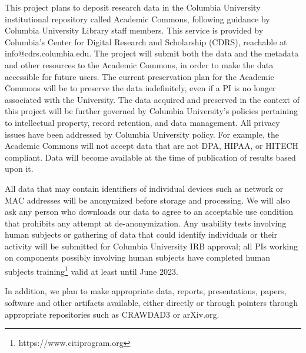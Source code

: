 \documentclass[11pt]{article}
\begin{document}
This project plans to deposit research data in the Columbia University institutional repository called Academic Commons, following guidance by Columbia University Library staff members. This service is provided by Columbia's Center for Digital Research and Scholarship (CDRS), reachable at info@cdrs.columbia.edu. The project will submit both the data and the metadata and other resources to the Academic Commons, in order to make the data accessible for future users.  The current preservation plan for the Academic Commons will be to preserve the data indefinitely, even if a PI is no longer associated with the University. The data acquired and preserved in the context of this project will be further governed by Columbia University's policies pertaining to intellectual property, record retention, and data management. All privacy issues have been addressed by Columbia University policy. For example, the Academic Commons will not accept data that are not DPA, HIPAA, or HITECH compliant. Data will become available at the time of publication of results based upon it.

All data that may contain identifiers of individual devices such as network or MAC addresses will be anonymized before storage and processing. We will also ask any person who downloads our data to agree to an acceptable use condition that prohibits any attempt at de-anonymization. Any usability tests involving human subjects or gathering of data that could identify individuals or their activity will be submitted for Columbia University IRB approval; all PIs working on components possibly involving human subjects have completed human subjects training\footnote{https://www.citiprogram.org} valid at least until June 2023.

In addition, we plan to make appropriate data, reports, presentations, papers, software and other artifacts available, either directly or through pointers through appropriate repositories such as CRAWDAD3 or arXiv.org.
\end{document}
